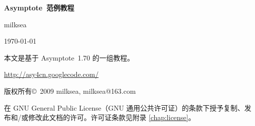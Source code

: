 \documentclass[cs4size,oneside,openany]{ctexbook}
\newcommand*\Asy{\textsf{Asymptote}}
\newcommand*\asyversion{1.70}
\begin{document}
\frontmatter

\begin{titlepage}
\begin{center}
  {\bfseries
  \Asy\ 范例教程}
\bigskip

  {\sffamily
  milksea}
\bigskip

  {\today}
\end{center}
\end{titlepage}

\begingroup
\setlength{\parindent}{0pt}
本文是基于 \Asy\ \asyversion{} 的一组教程。

\url{http://asy4cn.googlecode.com/}
\medskip

版权所有\copyright\ 2009 milksea, milksea@163.com

{\setlength{\leftskip}{2em}
在 GNU General Public License（GNU 通用公共许可证）的条款下授予复制、发布和/或修改此文档的许可。许可证条款见附录 \ref{chap:license}。\par}
\endgroup
\newpage

\mainmatter




\appendix


\printindex



\end{document}

